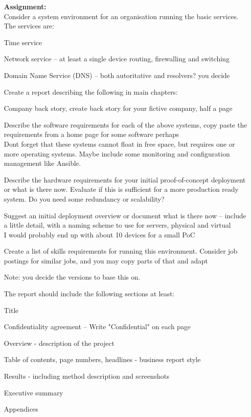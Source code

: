 \documentclass[a4paper,11pt,notitlepage,landscape]{report}
\begin{document}
{}


\normal


{\bf Assignment:}\\
Consider a system environment for an organisation running the basic services. The services are:

\begin{list2}
\item Time service
\item Network service -- at least a single device routing, firewalling and switching
\item Domain Name Service (DNS) -- both autoritative and resolvers? you decide
\end{list2}

Create a report describing the following in main chapters:

\begin{list2}
\item Company back story, create back story for your fictive company, half a page
\item Describe the software requirements for each of the above systems, copy paste the requirements from a home page for some software perhaps\\
Dont forget that these systems cannot float in free space, but requires one or more operating systems. Maybe include some monitoring and configuration management like Ansible.
\item Describe the hardware requirements for your initial proof-of-concept deployment or what is there now.
Evaluate if this is sufficient for a more production ready system. Do you need some redundancy or scalability?
\item Suggest an initial deployment overview or document what is there now -- include a little detail, with a naming scheme to use for servers, physical and virtual\\
I would probably end up with about 10 devices for a small PoC
\item Create a list of skills requirements for running this environment. Consider job postings for similar jobs, and you may copy parts of that and adapt
\end{list2}

Note: you decide the versions to base this on.

The report should include the following sections at least:
\begin{list2}
\item Title
\item Confidentiality agreement -- Write "Confidential" on each page
\item Overview - description of the project
\item Table of contents, page numbers, headlines - business report style
\item Results - including method description and screenshots
\item Executive summary
\item Appendices
\end{list2}
\end{document}
